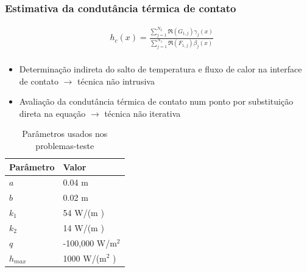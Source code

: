 \documentclass{beamer}
\begin{document}
\begin{frame}
	\frametitle{Estimativa da condutância térmica de contato}
	\begin{alertblock}{}
		\begin{align*}
		& h_c(x) %
		= \frac{\displaystyle\sum_{j=1}^{N_2} \Re(G_{1,j}) \gamma_j(x)}{\displaystyle\sum_{j=1}^{N_1} \Re(F_{1,j}) \beta_j(x)} \\
		\end{align*}
	\end{alertblock}

	\begin{itemize}
		\item Determinação indireta do salto de temperatura e fluxo de calor na interface de contato $\rightarrow$ técnica não intrusiva
	\item Avaliação da condutância térmica de contato num ponto por substituição direta na equação $\rightarrow$ técnica não iterativa
	\end{itemize}
\end{frame}


\begin{frame}
	\begin{table}[H]
		\centering
		\caption{Parâmetros usados nos problemas-teste}
		\begin{tabular}{|l|l|}
			\hline
			\textbf{Parâmetro} & \textbf{Valor}  \\ \hline
			$a$       & 0.04 m   \\ \hline
			$b$       & 0.02 m     \\ \hline
			$k_1$     & 54 W/(m \celsius)  \\ \hline
			$k_2$     & 14 W/(m \celsius) \\ \hline
			$q$       & -100,000 W/$\text{m}^2$ \\ \hline
			$h_{max}$       & 1000 W/($\text{m}^2$ \celsius) \\ \hline
		\end{tabular}		
		\label{tabela_params}
	\end{table}
\end{frame}

%

	
\end{document}
